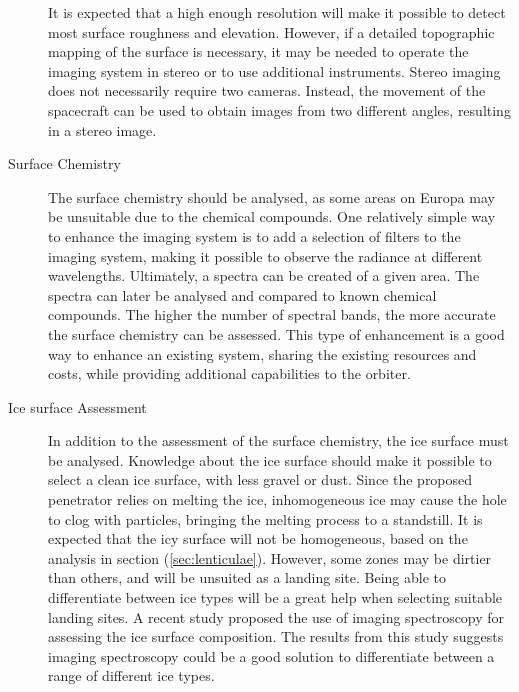 \begin{description}
It is expected that a high enough resolution will make it possible to detect most surface roughness and elevation. However, if a detailed topographic mapping of the surface is necessary, it may be needed to operate the imaging system in stereo or to use additional instruments. Stereo imaging does not necessarily require two cameras. Instead, the movement of the spacecraft can be used to obtain images from two different angles, resulting in a stereo image. 
\item[Surface Chemistry]
The surface chemistry should be analysed, as some areas on Europa may be unsuitable due to the chemical compounds. One relatively simple way to enhance the imaging system is to add a selection of filters to the imaging system, making it possible to observe the radiance at different wavelengths. Ultimately, a spectra can be created of a given area. The spectra can later be analysed and compared to known chemical compounds. The higher the number of spectral bands, the more accurate the surface chemistry can be assessed. This type of enhancement is a good way to enhance an existing system, sharing the existing resources and costs, while providing additional capabilities to the orbiter.
\item[Ice surface Assessment]
In addition to the assessment of the surface chemistry, the ice surface must be analysed. Knowledge about the ice surface should make it possible to select a clean ice surface, with less gravel or dust. Since the proposed penetrator relies on melting the ice, inhomogeneous ice may cause the hole to clog with particles, bringing the melting process to a standstill. It is expected that the icy surface will not be homogeneous, based on the analysis in section (\ref{sec:lenticulae}). However, some zones may be dirtier than others, and will be unsuited as a landing site. Being able to differentiate between ice types will be a great help when selecting suitable landing sites. A recent study \cite{naegeli2015a} proposed the use of imaging spectroscopy for assessing the ice surface composition. The results from this study suggests imaging spectroscopy could be a good solution to differentiate between a range of different ice types.
\end{description}
